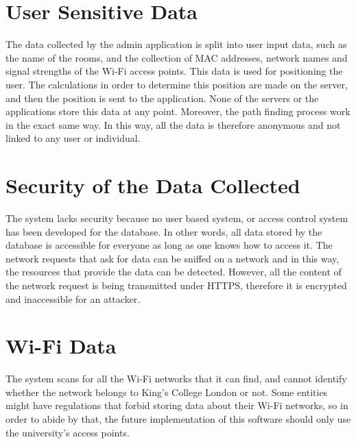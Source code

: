 \section{User Sensitive Data}
The data collected by the admin application is split into user input data, such as the name of the rooms, and the collection of MAC addresses, network names and signal strengths of the Wi-Fi access points. This data is used for positioning the user. The calculations in order to determine this position are made on the server, and then the position is sent to the application. None of the servers or the applications store this data at any point. Moreover, the path finding process work in the exact same way. In this way, all the data is therefore anonymous and not linked to any user or individual.

\section{Security of the Data Collected}
The system lacks security because no user based system, or access control system has been developed for the database. In other words, all data stored by the database is accessible for everyone as long as one knows how to access it. The network requests that ask for data can be sniffed on a network and in this way, the resources that provide the data can be detected. However, all the content of the network request is being transmitted under HTTPS, therefore it is encrypted and inaccessible for an attacker.

\section{Wi-Fi Data}
The system scans for all the Wi-Fi networks that it can find, and cannot identify whether the network belongs to King's College London or not. Some entities might have regulations that forbid storing data about their Wi-Fi networks, so in order to abide by that, the future implementation of this software should only use the university's access points.